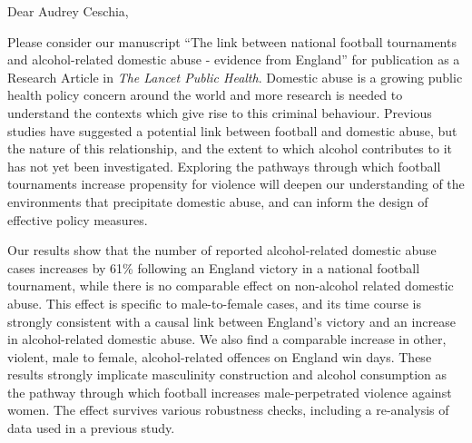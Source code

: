 \documentclass{letter}
\begin{document}
\begin{letter}
{}

%


\opening{Dear Audrey Ceschia,} %

Please consider our manuscript ``The link between national football tournaments and alcohol-related domestic abuse - evidence from England'' for publication as a Research Article in \textit{The Lancet Public Health}. Domestic abuse is a growing public health policy concern around the world and more research is needed to understand the contexts which give rise to this criminal behaviour. Previous studies have suggested a potential link between football and domestic abuse, but the nature of this relationship, and the extent to which alcohol contributes to it has not yet been investigated. Exploring the pathways through which football tournaments increase propensity for violence will deepen our understanding of the environments that precipitate domestic abuse, and can inform the design of effective policy measures.


Our results show that the number of reported alcohol-related domestic abuse cases increases by 61\% following an England victory in a national football tournament, while there is no comparable effect on non-alcohol related domestic abuse. This effect is specific to male-to-female cases, and its time course is strongly consistent with a causal link between England's victory and an increase in alcohol-related domestic abuse. We also find a comparable increase in other, violent, male to female, alcohol-related offences on England win days. These results strongly implicate masculinity construction and alcohol consumption as the pathway through which football increases male-perpetrated violence against women. The effect survives various robustness checks, including a re-analysis of data used in a previous study. 


\end{letter}
\end{document}
